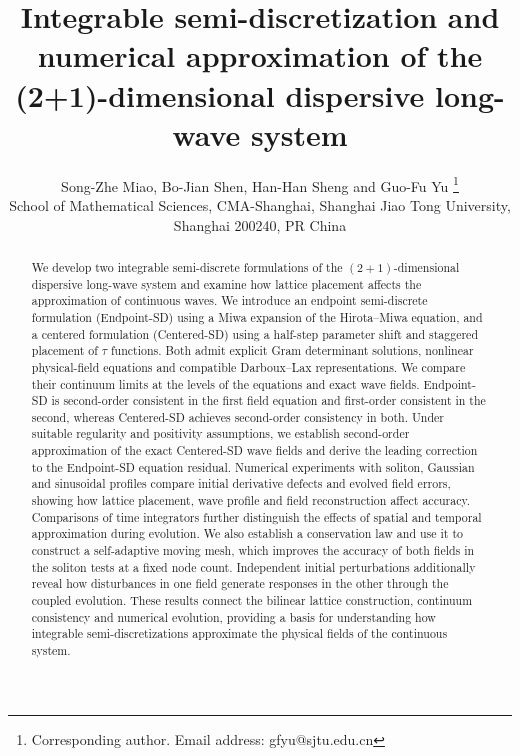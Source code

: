 \documentclass{article}
\theoremstyle{plain}
\theoremstyle{definition}
\begin{document}
\title{\bfseries Integrable semi-discretization and numerical approximation of the (2+1)-dimensional dispersive long-wave system}
\author{Song-Zhe Miao, Bo-Jian Shen, Han-Han Sheng and Guo-Fu Yu
\thanks{Corresponding author. Email address: gfyu@sjtu.edu.cn}\\
School of Mathematical Sciences, CMA-Shanghai, Shanghai Jiao Tong University,\\
Shanghai 200240, PR China\\}
\date{}
\maketitle
\begin{abstract}
We develop two integrable semi-discrete formulations of the \((2+1)\)-dimensional dispersive long-wave system and examine how lattice placement affects the approximation of continuous waves. We introduce an endpoint semi-discrete formulation (Endpoint-SD) using a Miwa expansion of the Hirota–Miwa equation, and a centered formulation (Centered-SD) using a half-step parameter shift and staggered placement of \(\tau\) functions. Both admit explicit Gram determinant solutions, nonlinear physical-field equations and compatible Darboux–Lax representations. We compare their continuum limits at the levels of the equations and exact wave fields. Endpoint-SD is second-order consistent in the first field equation and first-order consistent in the second, whereas Centered-SD achieves second-order consistency in both. Under suitable regularity and positivity assumptions, we establish second-order approximation of the exact Centered-SD wave fields and derive the leading correction to the Endpoint-SD equation residual. Numerical experiments with soliton, Gaussian and sinusoidal profiles compare initial derivative defects and evolved field errors, showing how lattice placement, wave profile and field reconstruction affect accuracy. Comparisons of time integrators further distinguish the effects of spatial and temporal approximation during evolution. We also establish a conservation law and use it to construct a self-adaptive moving mesh, which improves the accuracy of both fields in the soliton tests at a fixed node count. Independent initial perturbations additionally reveal how disturbances in one field generate responses in the other through the coupled evolution. These results connect the bilinear lattice construction, continuum consistency and numerical evolution, providing a basis for understanding how integrable semi-discretizations approximate the physical fields of the continuous system.
\end{abstract}
\end{document}
